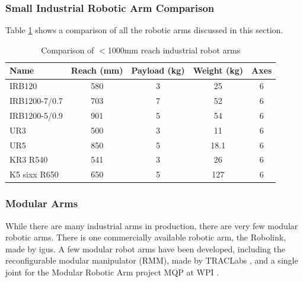 \subsubsection{Small Industrial Robotic Arm Comparison}
Table \ref{tab:ArmComparisonP} shows a comparison of all the robotic arms discussed in this section.
\begin{table} [H]
	\centering
	\begin{tabular}{| l | c | c | c | c |}
		\hline
		\textbf{Name} & \textbf{Reach (mm)} & \textbf{Payload (kg)} & \textbf{Weight (kg)} & \textbf{Axes} \\
		\hline
		IRB120 & 580 & 3 & 25 & 6 \\
		IRB1200-7/0.7 & 703 & 7 & 52 & 6 \\
		IRB1200-5/0.9 & 901 & 5 & 54 & 6 \\
		UR3 & 500 & 3 & 11 & 6 \\
		UR5 & 850 & 5 & 18.1 & 6 \\
		KR3 R540 & 541 & 3 & 26 & 6 \\
		K5 sixx R650 & 650 & 5 & 127 & 6 \\
		\hline
	\end{tabular}
	\caption{Comparison of $<$1000mm reach industrial robot arms}
	\label{tab:ArmComparisonP}
\end{table}

\subsubsection{Modular Arms}
While there are many industrial arms in production, there are very few modular robotic arms. There is one commercially available robotic arm, the Robolink, made by igus. A few modular robot arms have been developed, including the reconfigurable modular manipulator (RMM), made by TRACLabs \cite{RMM}, and a single joint for the Modular Robotic Arm project MQP at WPI \cite{MRA}.

